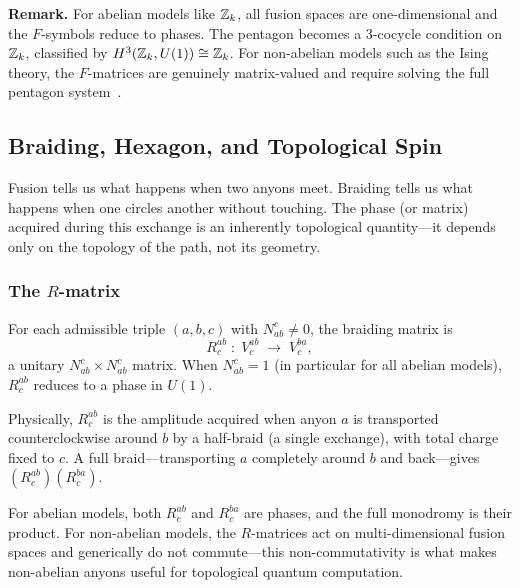 \medskip
\noindent\textbf{Remark.}
For abelian models like $\mathbb{Z}_k$, all fusion spaces are one-dimensional and
the $F$-symbols reduce to phases.  The pentagon becomes a $3$-cocycle condition
on $\mathbb{Z}_k$, classified by $H^3(\mathbb{Z}_k, U(1)) \cong \mathbb{Z}_k$.  For non-abelian models
such as the Ising theory, the $F$-matrices are genuinely matrix-valued and
require solving the full pentagon
system~\cite{NayakSimonSternFreedmanDasSarma2008NonabelianAnyons}.

\subsection{Braiding, Hexagon, and Topological Spin}
\label{subsec:braiding-hexagon}

Fusion tells us what happens when two anyons meet.  Braiding tells us what happens when one circles another without touching.  The phase (or matrix) acquired during this exchange is an inherently topological quantity---it depends only on the topology of the path, not its geometry.

\subsubsection*{The $R$-matrix}

\begin{definition}[$R$-matrix]
\label{def:r-matrix}
For each admissible triple $(a,b,c)$ with $N^c_{ab} \neq 0$, the braiding
matrix is
\begin{equation}
\label{eq:r-matrix}
    R^{ab}_c \;:\; V^{ab}_c \;\longrightarrow\; V^{ba}_c,
\end{equation}
a unitary $N^c_{ab} \times N^c_{ab}$ matrix.  When $N^c_{ab} = 1$ (in
particular for all abelian models), $R^{ab}_c$ reduces to a phase in $U(1)$.
\end{definition}

\noindent
Physically, $R^{ab}_c$ is the amplitude acquired when anyon $a$ is transported
counterclockwise around $b$ by a half-braid (a single exchange), with total
charge fixed to $c$.  A full braid---transporting $a$ completely around $b$
and back---gives $(R^{ab}_c)(R^{ba}_c)$.

For abelian models, both $R^{ab}_c$ and $R^{ba}_c$ are phases, and the full
monodromy is their product.  For non-abelian models, the $R$-matrices act on
multi-dimensional fusion spaces and generically do not commute---this
non-commutativity is what makes non-abelian anyons useful for topological
quantum computation.

